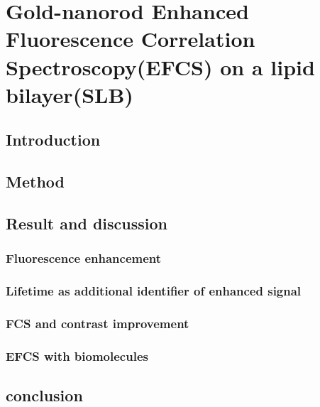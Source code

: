 \chapter{Gold-nanorod Enhanced Fluorescence Correlation Spectroscopy(EFCS) on a lipid bilayer(SLB)}
\section{Introduction}
\section{Method}
\section{Result and discussion}
\subsection{Fluorescence enhancement}
\subsection{Lifetime as additional identifier of enhanced signal}
\subsection{FCS and contrast improvement}
\subsection{EFCS with biomolecules}
\section{conclusion}